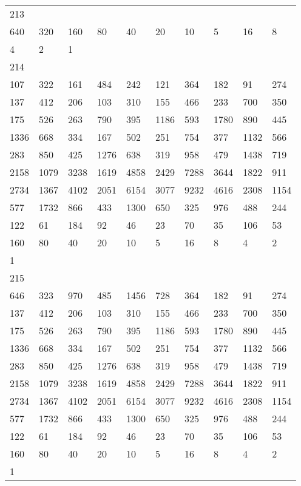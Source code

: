 \begin{longtable}{*{10}{l}}
213&&&&&&&&&\\
640& 320& 160& 80& 40& 20& 10& 5& 16& 8\\
4& 2& 1& \\

214&&&&&&&&&\\
107& 322& 161& 484& 242& 121& 364& 182& 91& 274\\
137& 412& 206& 103& 310& 155& 466& 233& 700& 350\\
175& 526& 263& 790& 395& 1186& 593& 1780& 890& 445\\
1336& 668& 334& 167& 502& 251& 754& 377& 1132& 566\\
283& 850& 425& 1276& 638& 319& 958& 479& 1438& 719\\
2158& 1079& 3238& 1619& 4858& 2429& 7288& 3644& 1822& 911\\
2734& 1367& 4102& 2051& 6154& 3077& 9232& 4616& 2308& 1154\\
577& 1732& 866& 433& 1300& 650& 325& 976& 488& 244\\
122& 61& 184& 92& 46& 23& 70& 35& 106& 53\\
160& 80& 40& 20& 10& 5& 16& 8& 4& 2\\
1& \\

215&&&&&&&&&\\
646& 323& 970& 485& 1456& 728& 364& 182& 91& 274\\
137& 412& 206& 103& 310& 155& 466& 233& 700& 350\\
175& 526& 263& 790& 395& 1186& 593& 1780& 890& 445\\
1336& 668& 334& 167& 502& 251& 754& 377& 1132& 566\\
283& 850& 425& 1276& 638& 319& 958& 479& 1438& 719\\
2158& 1079& 3238& 1619& 4858& 2429& 7288& 3644& 1822& 911\\
2734& 1367& 4102& 2051& 6154& 3077& 9232& 4616& 2308& 1154\\
577& 1732& 866& 433& 1300& 650& 325& 976& 488& 244\\
122& 61& 184& 92& 46& 23& 70& 35& 106& 53\\
160& 80& 40& 20& 10& 5& 16& 8& 4& 2\\
1& \\


\end{longtable}
